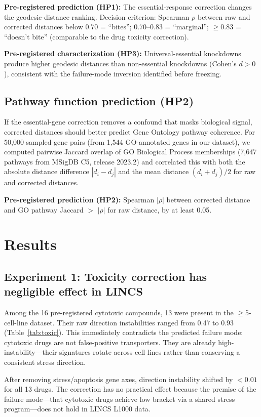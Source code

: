 \documentclass{article}
\begin{document}
\textbf{Pre-registered prediction (HP1):} The essential-response correction
changes the geodesic-distance ranking. Decision criterion: Spearman $\rho$
between raw and corrected distances below 0.70 = ``bites''; 0.70--0.83 =
``marginal''; $\geq 0.83$ = ``doesn't bite'' (comparable to the drug
toxicity correction).

\textbf{Pre-registered characterization (HP3):} Universal-essential
knockdowns produce higher geodesic distances than non-essential knockdowns
(Cohen's $d > 0$), consistent with the failure-mode inversion identified
before freezing.

\subsection{Pathway function prediction (HP2)}

If the essential-gene correction removes a confound that masks biological
signal, corrected distances should better predict Gene Ontology pathway
coherence. For 50{,}000 sampled gene pairs (from 1{,}544 GO-annotated genes
in our dataset), we computed pairwise Jaccard overlap of GO Biological
Process memberships (7{,}647 pathways from MSigDB C5, release 2023.2) and
correlated this with both the absolute distance difference $|d_i - d_j|$
and the mean distance $(d_i + d_j)/2$ for raw and corrected distances.

\textbf{Pre-registered prediction (HP2):} Spearman $|\rho|$ between corrected
distance and GO pathway Jaccard $>$ $|\rho|$ for raw distance, by at least
0.05.

\section{Results}

\subsection{Experiment 1: Toxicity correction has negligible effect in LINCS}

Among the 16 pre-registered cytotoxic compounds, 13 were present in the
$\geq$5-cell-line dataset. Their raw direction instabilities ranged from
0.47 to 0.93 (Table~\ref{tab:toxic}). This immediately contradicts the
predicted failure mode: cytotoxic drugs are not false-positive transporters.
They are already high-instability---their signatures rotate across cell lines
rather than conserving a consistent stress direction.

After removing stress/apoptosis gene axes, direction instability shifted by
$<0.01$ for all 13 drugs. The correction has no practical effect because the
premise of the failure mode---that cytotoxic drugs achieve low bracket via
a shared stress program---does not hold in LINCS L1000 data.
\end{document}
